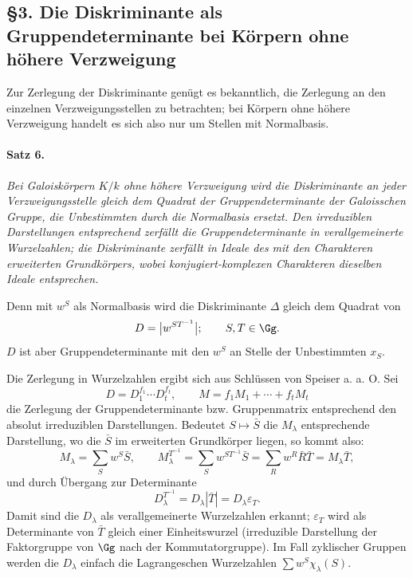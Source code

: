 \subsection*{§3. Die Diskriminante als Gruppendeterminante bei Körpern ohne höhere Verzweigung}

Zur Zerlegung der Diskriminante genügt es bekanntlich, die Zerlegung an den einzelnen Verzweigungsstellen zu betrachten; bei Körpern ohne höhere Verzweigung handelt es sich also nur um Stellen mit Normalbasis.

\paragraph{Satz 6.}
\emph{Bei Galoiskörpern \(K/k\) ohne höhere Verzweigung wird die Diskriminante an jeder Verzweigungsstelle gleich dem Quadrat der Gruppendeterminante der Galoisschen Gruppe, die Unbestimmten durch die Normalbasis ersetzt. Den irreduziblen Darstellungen entsprechend zerfällt die Gruppendeterminante in verallgemeinerte Wurzelzahlen; die Diskriminante zerfällt in Ideale des mit den Charakteren erweiterten Grundkörpers, wobei konjugiert-komplexen Charakteren dieselben Ideale entsprechen.}

Denn mit \(w^S\) als Normalbasis wird die Diskriminante \(\Delta\) gleich dem Quadrat von
\[
    D=\bigl|w^{ST^{-1}}\bigr|;\qquad S,T\in\Gg.
\]
\(D\) ist aber Gruppendeterminante mit den \(w^S\) an Stelle der Unbestimmten \(x_S\).

Die Zerlegung in Wurzelzahlen ergibt sich aus Schlüssen von Speiser a. a. O. Sei
\[
        D=D_1^{f_1}\cdots D_t^{f_t},
        \qquad
        M=f_1M_1+\cdots+f_tM_t
\]
die Zerlegung der Gruppendeterminante bzw. Gruppenmatrix entsprechend den absolut irreduziblen Darstellungen. Bedeutet \(S\mapsto\bar S\) die \(M_\lambda\) entsprechende Darstellung, wo die \(\bar S\) im erweiterten Grundkörper liegen, so kommt also:
\[
        M_\lambda=\sum_S w^S\bar S,
        \qquad
        M_\lambda^{T^{-1}}=\sum_S w^{ST^{-1}}\bar S
          =\sum_R w^R\bar R\bar T=M_\lambda\bar T,
\]
und durch Übergang zur Determinante
\[
        D_\lambda^{T^{-1}}=D_\lambda|\bar T|=D_\lambda\varepsilon_T.
\]
Damit sind die \(D_\lambda\) als verallgemeinerte Wurzelzahlen erkannt; \(\varepsilon_T\) wird als Determinante von \(\bar T\) gleich einer Einheitswurzel (irreduzible Darstellung der Faktorgruppe von \(\Gg\) nach der Kommutatorgruppe). Im Fall zyklischer Gruppen werden die \(D_\lambda\) einfach die Lagrangeschen Wurzelzahlen \(\sum w^S\chi_\lambda(S)\).

